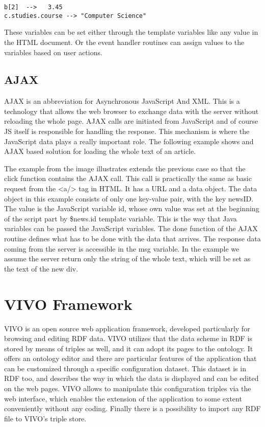 \begin{lstlisting}[basicstyle=\footnotesize, frame=single, caption={JavaScript data access}, captionpos=b]
b[2]  -->   3.45
c.studies.course --> "Computer Science"
\end{lstlisting}


These variables can be set either through the template variables like any value in the HTML document. Or the event handler routines can assign values to the variables based on user actions.

\subsection{AJAX}

AJAX is an abbreviation for Asynchronous JavaScript And XML. This is a technology that allows the web browser to exchange data with the server without reloading the whole page. AJAX calls are initiated from JavaScript and of course JS itself is responsible for handling the response. This mechanism is where the JavaScript data plays a really important role. The following example shows and AJAX based solution for loading the whole text of an article.


The example from the image illustrates extends the previous case so that the click function contains the AJAX call. This call is practically the same as basic request from the <a/> tag in HTML. It has a URL and a data object. The data object in this example consists of only one key-value pair, with the key newsID. The value is the JavaScript variable id, whose own value was set at the beginning of the script part by \${news.id} template variable. This is the way that Java variables can be passed the JavaScript variables.  The done function of the AJAX routine defines what has to be done with the data that arrives. The response data coming from the server is accessible in the msg variable. In the example we assume the server return only the string of the whole text, which will be set as the text of the new div.




\section{VIVO Framework}

VIVO is an open source web application framework, developed particularly for browsing and editing RDF data. VIVO utilizes that the data scheme in RDF is stored by means of triples as well, and it can adopt its pages to the ontology.  It offers an ontology editor and there are particular features of the application that can be customized through a specific configuration dataset.  This dataset is in RDF too, and describes the way in which the data is displayed and can be edited on the web pages. VIVO allows to manipulate this configuration triples via the web interface, which enables the extension of the application to some extent conveniently without any coding. Finally there is a possibility to import any RDF file to VIVO’s triple store.

